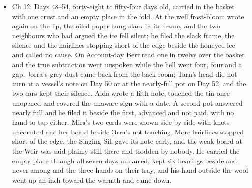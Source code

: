 \documentclass{design/chronicle}
\begin{document}
{\begin{itemize}[leftmargin=1.4em,itemsep=1pt,topsep=3pt,parsep=0pt]
\item Ch 12: Days 48–54, forty-eight to fifty-four days old, carried in the basket with one crust and an empty place in the fold. At the well frost-bloom wrote again on the lip, the oiled paper hung slack in its frame, and the two neighbours who had argued the ice fell silent; he filed the slack frame, the silence and the hairlines stopping short of the edge beside the honeyed ice and called no cause. On Account-day Berr read one in twelve over the basket and the true subtraction went unspoken while the bell went four, four and a gap. Jorra’s grey dust came back from the back room; Tarn’s head did not turn at a vessel’s note on Day 50 or at the nearly-full pot on Day 52, and the two ears kept their silence. Alda wrote a fifth note, touched the tin once unopened and covered the unaware sign with a date. A second pot answered nearly full and he filed it beside the first, advanced and not paid, with no hand to tap either. Mira’s two cords were shown side by side with knots uncounted and her board beside Orra’s not touching. More hairlines stopped short of the edge, the Singing Sill gave its note early, and the weak board at the Weir was said plainly still there and trodden by nobody. He carried the empty place through all seven days unnamed, kept six hearings beside and never among and the three hands on their tray, and his hand outside the wool went up an inch toward the warmth and came down.

\end{itemize}

\begin{itemize}[leftmargin=1.4em,itemsep=1pt,topsep=3pt,parsep=0pt]


\end{itemize}}
\end{document}
